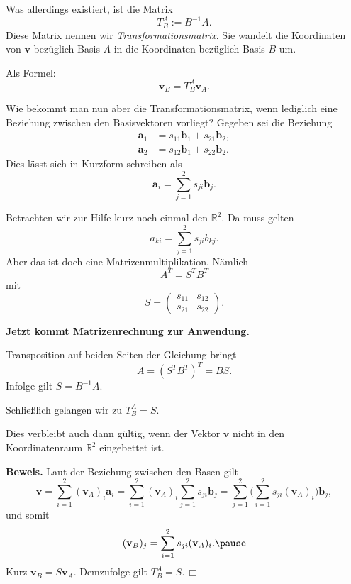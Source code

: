 \documentclass[9pt]{beamer}
\newcommand{\bv}[1]{\mathbf{#1}}
\newcommand{\R}{\mathbb R}
\newcommand{\strong}[1]{\textsf{\textbf{#1}}}
\renewcommand{\qedsymbol}{\ensuremath{\Box}}
\newcommand{\parspace}{\vspace{0.8em}}
\begin{document}
\begin{frame}
Was allerdings existiert, ist die Matrix
\[T_B^A := B^{-1}A.\]\pause
Diese Matrix nennen wir \emph{Transformationsmatrix}. Sie wandelt die
Koordinaten von $\bv v$ bezüglich Basis $A$ in die Koordinaten
bezüglich Basis $B$ um.\pause

\parspace
Als Formel:
\[\bv v_B = T_B^A \bv v_A.\]
\end{frame}

\begin{frame}
Wie bekommt man nun aber die Transformationsmatrix, wenn lediglich
eine Beziehung zwischen den Basisvektoren vorliegt? Gegeben sei
die Beziehung
\begin{align*}
\bv a_1 &= s_{11}\bv b_1 + s_{21}\bv b_2,\\
\bv a_2 &= s_{12}\bv b_1 + s_{22}\bv b_2.
\end{align*}\pause
Dies lässt sich in Kurzform schreiben als
\[\bv a_i = \sum_{j=1}^2 s_{ji}\bv b_j.\]
\end{frame}

\begin{frame}
Betrachten wir zur Hilfe kurz noch einmal den $\R^2$.
Da muss gelten
\[a_{ki} = \sum_{j=1}^2 s_{ji}b_{kj}.\]\pause
Aber das ist doch eine Matrizenmultiplikation. Nämlich
\[A^T = S^T B^T\]
mit
\[S = \begin{pmatrix}s_{11} & s_{12}\\
s_{21} & s_{22}\end{pmatrix}.\]
\end{frame}

\begin{frame}
\strong{Jetzt kommt Matrizenrechnung zur Anwendung.}\pause

\vspace{1em}
Transposition auf beiden Seiten der Gleichung bringt
\[A = (S^T B^T)^T = BS.\]\pause
Infolge gilt $S = B^{-1}A$.\pause

\vspace{1em}
Schließlich gelangen wir zu $T_B^A=S$.
\end{frame}

\begin{frame}
Dies verbleibt auch dann gültig, wenn der Vektor $\bv v$
nicht in den Koordinatenraum $\R^2$ eingebettet ist.\pause

\vspace{1em}
\strong{Beweis.} Laut der Beziehung zwischen den Basen gilt
\[\bv v = \sum_{i=1}^2 (\bv v_A)_i\bv a_i
= \sum_{i=1}^2 (\bv v_A)_i\sum_{j=1}^2 s_{ji}\bv b_j
= \sum_{j=1}^2\bigg(\sum_{i=1}^2 s_{ji}(\bv v_A)_i\bigg)\bv b_j,\]
und somit
\[(\bv v_B)_j = \sum_{i=1}^2 s_{ji}(\bv v_A)_i.\pause\]
Kurz $\bv v_B = S\bv v_A$.
Demzufolge gilt $T_B^A = S$.\,\qedsymbol
\end{frame}
\end{document}
